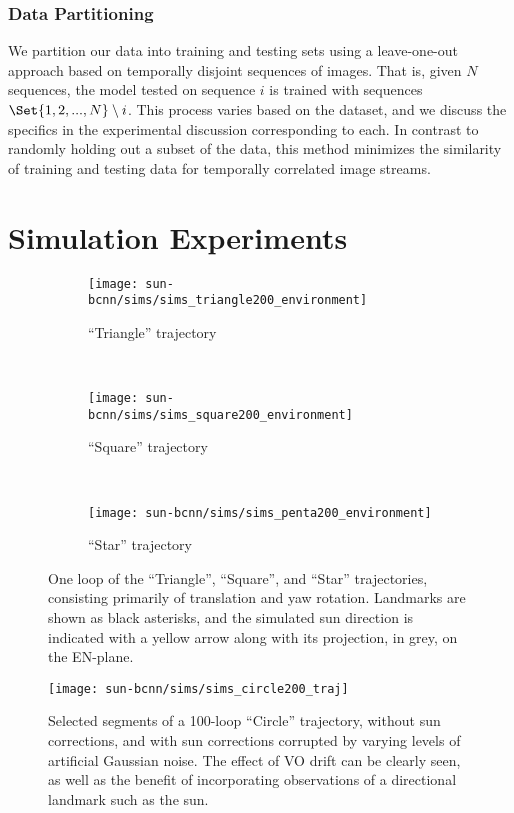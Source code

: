 \subsubsection{Data Partitioning}
    We partition our data into training and testing sets using a leave-one-out approach based on temporally disjoint sequences of images. That is, given $N$ sequences, the model tested on sequence $i$ is trained with sequences $\Set{1,2,..., N} \setminus i$. This process varies based on the dataset, and we discuss the specifics in the experimental discussion corresponding to each. In contrast to  randomly holding out a subset of the data, this method minimizes the similarity of training and testing data for temporally correlated image streams.

\section{Simulation Experiments} \label{sec:sim_vo}
\begin{figure*}
\centering
\begin{subfigure}{0.45\textwidth}
    \texttt{[image: sun-bcnn/sims/sims\_triangle200\_environment]}
    \caption{``Triangle'' trajectory}
\end{subfigure}
~
\begin{subfigure}{0.45\textwidth}
    \texttt{[image: sun-bcnn/sims/sims\_square200\_environment]}
    \caption{``Square'' trajectory}
\end{subfigure}
~
\begin{subfigure}{0.45\textwidth}
    \texttt{[image: sun-bcnn/sims/sims\_penta200\_environment]}
    \caption{``Star'' trajectory}
\end{subfigure}
\caption{One loop of the ``Triangle'', ``Square'', and ``Star'' trajectories, consisting primarily of translation and yaw rotation. Landmarks are shown as black asterisks, and the simulated sun direction is indicated with a yellow arrow along with its projection, in grey, on the EN-plane.}
\label{fig:sim_environment}
\end{figure*}

\begin{figure*}
\centering
\texttt{[image: sun-bcnn/sims/sims\_circle200\_traj]}
\caption{Selected segments of a 100-loop ``Circle'' trajectory, without sun corrections, and with sun corrections corrupted by varying levels of artificial Gaussian noise. The effect of VO drift can be clearly seen, as well as the benefit of incorporating observations of a directional landmark such as the sun.}
\label{fig:sim_topdown}
\end{figure*}

